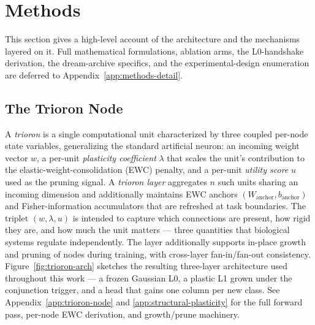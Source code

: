 \documentclass[11pt]{article}
\newcommand{\anchorW}{W_{\text{anchor}}}
\newcommand{\anchorB}{b_{\text{anchor}}}
\begin{document}
\section{Methods}
\label{sec:methods}

This section gives a high-level account of the architecture and the
mechanisms layered on it. Full mathematical formulations, ablation
arms, the L0-handshake derivation, the dream-archive specifics, and
the experimental-design enumeration are deferred to
Appendix~\ref{app:methods-detail}.

\subsection{The Trioron Node}
\label{sec:methods-trioron}

A \emph{trioron} is a single computational unit characterized by three
coupled per-node state variables, generalizing the standard artificial
neuron: an incoming weight vector $w$, a per-unit \emph{plasticity
coefficient} $\lambda$ that scales the unit's contribution to the
elastic-weight-consolidation (EWC) penalty, and a per-unit
\emph{utility score} $u$ used as the pruning signal. A \emph{trioron
layer} aggregates $n$ such units sharing an incoming dimension and
additionally maintains EWC anchors $(\anchorW, \anchorB)$ and
Fisher-information accumulators that are refreshed at task boundaries.
The triplet $(w, \lambda, u)$ is intended to capture which connections
are present, how rigid they are, and how much the unit matters ---
three quantities that biological systems regulate independently. The
layer additionally supports in-place growth and pruning of nodes
during training, with cross-layer fan-in/fan-out consistency.
Figure~\ref{fig:trioron-arch} sketches the resulting three-layer
architecture used throughout this work --- a frozen Gaussian L0, a
plastic L1 grown under the conjunction trigger, and a head that gains
one column per new class. See Appendix~\ref{app:trioron-node} and
\ref{app:structural-plasticity} for the full forward pass, per-node
EWC derivation, and growth/prune machinery.
\end{document}

